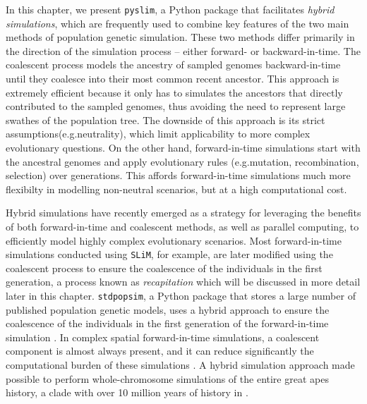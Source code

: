 \documentclass[12pt]{article}
\newcommand{\slim}[0]{\texttt{SLiM}\xspace}
\newcommand{\pyslim}[0]{\texttt{pyslim}\xspace}
\newcommand{\stdpopsim}[0]{\texttt{stdpopsim}\xspace}
\newcommand*{\eg}{e.g.\xcomma}
\begin{document}
In this chapter, we present \pyslim, a Python package that facilitates \emph{hybrid simulations},
which are frequently used to combine key features of the two main methods of population genetic simulation.
These two methods differ primarily in the direction of the simulation
process -- either forward- or backward-in-time. 
The coalescent process models the ancestry of sampled genomes
backward-in-time until they coalesce into their most common recent ancestor. %
This approach is extremely efficient because it only has to simulates the ancestors that directly contributed to the sampled genomes,
thus avoiding the need to represent large swathes of the population tree. 
The downside of this approach is its strict assumptions(\eg neutrality), 
which limit applicability to more complex evolutionary questions.
On the other hand, forward-in-time simulations start with the ancestral genomes and apply evolutionary rules (\eg mutation, recombination, selection) over generations.
This affords forward-in-time simulations much more flexibilty in modelling non-neutral scenarios, 
but at a high computational cost.

Hybrid simulations have recently emerged as a strategy for leveraging the benefits of both forward-in-time and coalescent methods, as well as parallel computing,
to efficiently model highly complex evolutionary scenarios.
Most forward-in-time simulations conducted using \slim, for example, are later modified using the coalescent process to ensure the coalescence of the individuals in the first generation, a process known as \emph{recapitation} which will be discussed in more detail later in this chapter.
\stdpopsim, a Python package that stores a large number of published population genetic models,
uses a hybrid approach to ensure the coalescence of the individuals in the first generation of the forward-in-time simulation \citep{adrion_community-maintained_2020,elise_expanding_nodate,gower_accessible_2025}.
In complex spatial forward-in-time simulations, a coalescent component is almost always present,
and it can reduce significantly the computational burden of these simulations \citep{battey_space_2020,petr_slendr_2023}.
A hybrid simulation approach made possible to perform whole-chromosome simulations of the entire great apes history, a clade with over 10 million years of history in \citet{rodrigues_shared_2024}.

\end{document}
